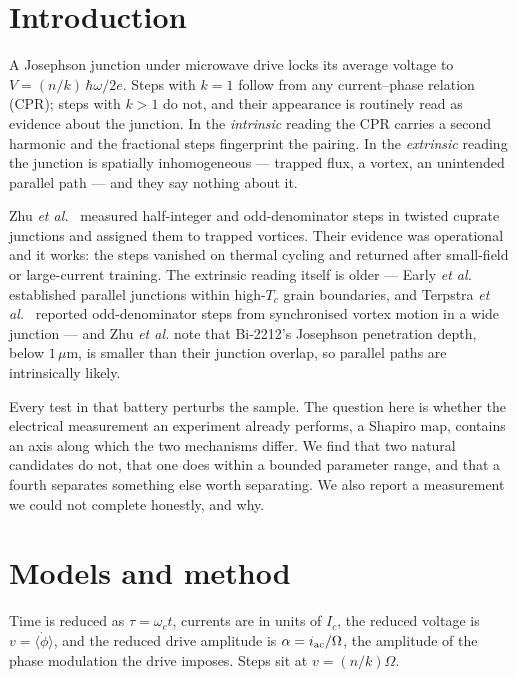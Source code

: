 \documentclass[aps,prb,twocolumn,superscriptaddress,floatfix,nofootinbib]{revtex4-2}
\begin{document}
\maketitle

\section{Introduction}

A Josephson junction under microwave drive locks its average voltage to
$V=(n/k)\,\hbar\omega/2e$. Steps with $k=1$ follow from any current--phase
relation (CPR); steps with $k>1$ do not, and their appearance is routinely read
as evidence about the junction. In the \emph{intrinsic} reading the CPR carries
a second harmonic and the fractional steps fingerprint the pairing. In the
\emph{extrinsic} reading the junction is spatially inhomogeneous --- trapped
flux, a vortex, an unintended parallel path --- and they say nothing about it.

Zhu \emph{et al.}~\cite{Zhu2026} measured half-integer and odd-denominator steps
in twisted cuprate junctions and assigned them to trapped vortices. Their
evidence was operational and it works: the steps vanished on thermal cycling and
returned after small-field or large-current training. The extrinsic reading
itself is older --- Early \emph{et al.}~\cite{Early1994} established parallel
junctions within high-$T_c$ grain boundaries, and Terpstra \emph{et
al.}~\cite{Terpstra1995} reported odd-denominator steps from synchronised vortex
motion in a wide junction --- and Zhu \emph{et al.} note that Bi-2212's
Josephson penetration depth, below $1\,\mu$m, is smaller than their junction
overlap, so parallel paths are intrinsically likely.

Every test in that battery perturbs the sample. The question here is whether the
electrical measurement an experiment already performs, a Shapiro map, contains
an axis along which the two mechanisms differ. We find that two natural
candidates do not, that one does within a bounded parameter range, and that a
fourth separates something else worth separating. We also report a measurement
we could not complete honestly, and why.

\section{Models and method}

Time is reduced as $\tau=\omega_c t$, currents are in units of $I_c$, the
reduced voltage is $v=\langle\dot\phi\rangle$, and the reduced drive amplitude
is $\alpha=i_{\rm ac}/\Omega$, the amplitude of the phase modulation the drive
imposes. Steps sit at $v=(n/k)\Omega$.
\end{document}

